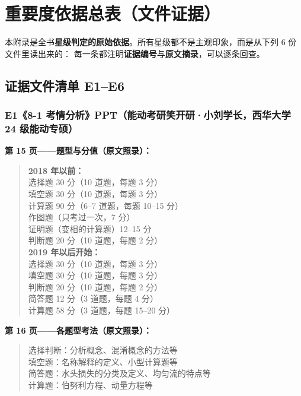 \chapter{重要度依据总表（文件证据）}
\label{ap:evidence}

\begin{tishi}
本附录是全书\textbf{星级判定的原始依据}。所有星级都不是主观印象，而是从下列 6 份文件里读出来的：
每一条都注明\textbf{证据编号}与\textbf{原文摘录}，可以逐条回查。
\end{tishi}

\section{证据文件清单 E1--E6}

\subsection*{E1\quad《8-1 考情分析》PPT（能动考研笑开研·小刘学长，西华大学 24 级能动专硕）}

\noindent\textbf{第 15 页——题型与分值（原文照录）：}

\begin{quote}\small
\textbf{2018 年以前：}\\
选择题 30 分（10 道题，每题 3 分）\\
填空题 30 分（10 道题，每题 3 分）\\
计算题 90 分（6--7 道题，每题 10--15 分）\\
作图题（只考过一次，7 分）\\
证明题（变相的计算题）12--15 分\\
判断题 20 分（10 道题，每题 2 分）\\[4pt]
\textbf{2019 年以后开始：}\\
选择题 30 分（10 道题，每题 3 分）\\
填空题 30 分（10 道题，每题 3 分）\\
判断题 20 分（10 道题，每题 2 分）\\
简答题 12 分（3 道题，每题 4 分）\\
计算题 58 分（3 道题，每题 15--20 分）
\end{quote}

\noindent\textbf{第 16 页——各题型考法（原文照录）：}

\begin{quote}\small
选择判断：分析概念、混淆概念的方法等\\
填空题：名称解释的定义、小型计算题等\\
简答题：水头损失的分类及定义、均匀流的特点等\\
计算题：伯努利方程、动量方程等
\end{quote}

